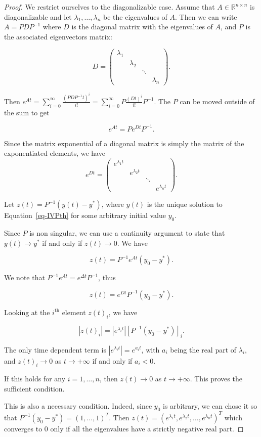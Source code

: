 \documentclass[
  letterpaper,
]{report}
\theoremstyle{plain}
\theoremstyle{definition}
\theoremstyle{definition}
\theoremstyle{remark}
\begin{document}
\begin{proof}

We restrict ourselves to the diagonalizable case. Assume that
\(A\in\mathbb{R}^{n\times n}\) is diagonalizable and let
\(\lambda_1,\dots,\lambda_n\) be the eigenvalues of \(A\). Then we can
write \(A = PD P^{-1}\) where \(D\) is the diagonal matrix with the
eigenvalues of \(A\), and \(P\) is the associated eigenvectors matrix:

\[
D = \begin{pmatrix}   
\lambda_1 & & &\\
&\lambda_2 & &  \\
&& \ddots & \\
&&& \lambda_n 
\end{pmatrix}.
\]

Then
\(e^{At} = \sum_{i=0}^\infty \frac{(PD P^{-1}t)^i}{i!} = \sum_{i=0}^\infty P \frac{(D t)^i}{i!}P^{-1}\).
The \(P\) can be moved outside of the sum to get

\[
e^{At} = P e^{D t}P^{-1}.
\]

Since the matrix exponential of a diagonal matrix is simply the matrix
of the exponentiated elements, we have \[
e^{D t} = \begin{pmatrix}   
e^{\lambda_1 t} & & &\\
&e^{\lambda_2 t} & &  \\
&& \ddots & \\
&&& e^{\lambda_n t}
\end{pmatrix}.
\]

Let \(z(t) = P^{-1}(y(t)-y^*)\), where \(y(t)\) is the unique solution
to Equation~\ref{eq-IVPth} for some arbitrary initial value \(y_0\).

Since \(P\) is non singular, we can use a continuity argument to state
that \(y(t) \to y^*\) if and only if \(z(t) \to 0\). We have

\[
z(t) = P^{-1} e^{At}(y_0-y^*).
\]

We note that \(P^{-1} e^{At} = e^{\Delta t} P^{-1}\), thus

\[
z(t) = e^{D t} P^{-1}(y_0-y^*).
\]

Looking at the \(i^{\text{th}}\) element \(z(t)_i\), we have

\[
|z(t)_i| = |e^{\lambda_i t}|\left[ P^{-1}(y_0-y^*)\right]_i.
\]

The only time dependent term is \(|e^{\lambda_i t}| = e^{a_it}\), with
\(a_i\) being the real part of \(\lambda_i\), and \(z(t)_i \to 0\) as
\(t \to +\infty\) if and only if \(a_i<0\).

If this holds for any \(i = 1, \dots , n\), then \(z(t) \to 0\) as
\(t\to +\infty\). This proves the sufficient condition.

This is also a necessary condition. Indeed, since \(y_0\) is arbitrary,
we can chose it so that \(P^{-1}(y_0-y^*) = (1, \dots , 1)^T\). Then
\(z(t) = (e^{\lambda_1 t}, e^{\lambda_2 t}, \dots , e^{\lambda_n t})^T\)
which converges to \(0\) only if all the eigenvalues have a strictly
negative real part.

\end{proof}
\end{document}
